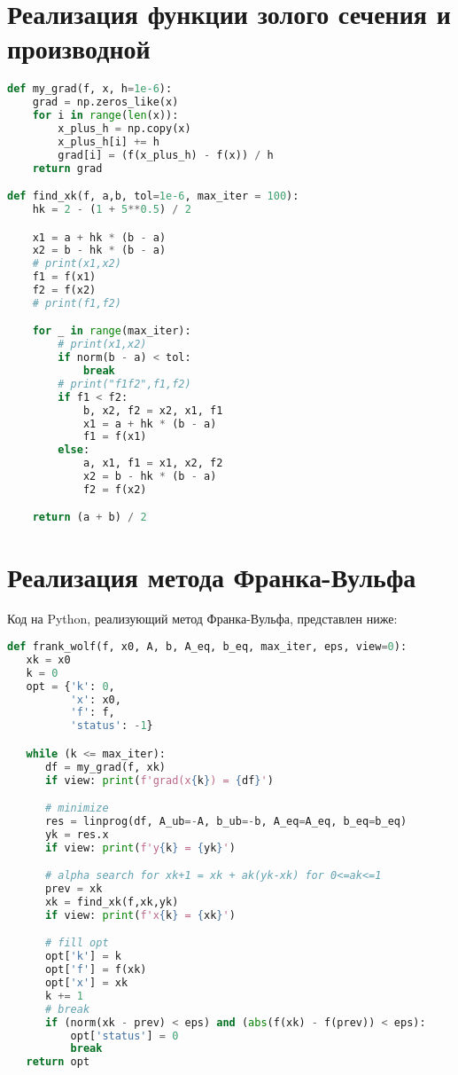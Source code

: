 \documentclass{article}
\begin{document}
\section{Реализация функции золого сечения и производной}
\begin{lstlisting}[language=Python]
def my_grad(f, x, h=1e-6):
    grad = np.zeros_like(x)
    for i in range(len(x)):
    	x_plus_h = np.copy(x)
    	x_plus_h[i] += h
    	grad[i] = (f(x_plus_h) - f(x)) / h
    return grad

def find_xk(f, a,b, tol=1e-6, max_iter = 100):
    hk = 2 - (1 + 5**0.5) / 2

    x1 = a + hk * (b - a)
    x2 = b - hk * (b - a)
    # print(x1,x2)
    f1 = f(x1)
    f2 = f(x2)
    # print(f1,f2)

    for _ in range(max_iter):
        # print(x1,x2)
        if norm(b - a) < tol:
            break
        # print("f1f2",f1,f2)
        if f1 < f2:
            b, x2, f2 = x2, x1, f1
            x1 = a + hk * (b - a)
            f1 = f(x1)
        else:
            a, x1, f1 = x1, x2, f2
            x2 = b - hk * (b - a)
            f2 = f(x2)

    return (a + b) / 2
\end{lstlisting}


\newpage
\section{Реализация метода Франка-Вульфа}
Код на Python, реализующий метод Франка-Вульфа, представлен ниже:

\begin{lstlisting}[language=Python]
def frank_wolf(f, x0, A, b, A_eq, b_eq, max_iter, eps, view=0):
   xk = x0
   k = 0
   opt = {'k': 0,
          'x': x0,
          'f': f,
          'status': -1}

   while (k <= max_iter):
      df = my_grad(f, xk)
      if view: print(f'grad(x{k}) = {df}')

      # minimize
      res = linprog(df, A_ub=-A, b_ub=-b, A_eq=A_eq, b_eq=b_eq)
      yk = res.x
      if view: print(f'y{k} = {yk}')

      # alpha search for xk+1 = xk + ak(yk-xk) for 0<=ak<=1
      prev = xk
      xk = find_xk(f,xk,yk)
      if view: print(f'x{k} = {xk}')

      # fill opt
      opt['k'] = k
      opt['f'] = f(xk)
      opt['x'] = xk
      k += 1
      # break
      if (norm(xk - prev) < eps) and (abs(f(xk) - f(prev)) < eps):
          opt['status'] = 0
          break
   return opt
\end{lstlisting}
\end{document}
